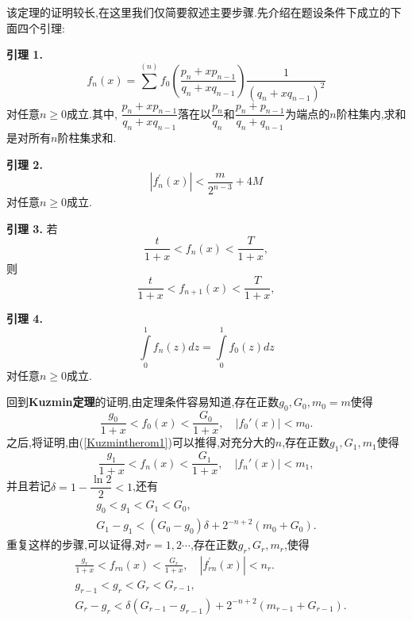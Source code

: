 该定理的证明较长,在这里我们仅简要叙述主要步骤.先介绍在题设条件下成立的下面四个引理:\par
\textbf{引理 1.  }\textsuperscript{\cite{Iosifescu}}
\begin{equation}\label{lemma1}
f_{n}\left(x\right)=\sum^{\left(n\right)}f_{0}\left(\frac{p_{n}+x p_{n-1}}{q_{n}+x q_{n-1}}\right)\frac{1}{\left(q_{n}+x q_{n-1}\right)^{2}}
\end{equation}
对任意$n\geqslant 0$成立.其中, $\dfrac{p_{n}+xp_{n-1}}{q_{n}+xq_{n-1}}$落在以$\dfrac{p_{n}}{q_{n}}$和$\dfrac{p_{n}+p_{n-1}}{q_{n}+q_{n-1}}$为端点的$n$阶柱集内,求和是对所有$n$阶柱集求和.\par
\par
\textbf{引理 2.  }\textsuperscript{\cite{Iosifescu}}
\begin{equation}\label{lemma2}
\left|f_{n}^{'}(x)\right|<\frac{m}{2^{n-3}}+4M
\end{equation}
对任意$n\geqslant0$成立.\par
\par
\textbf{引理 3.  }\textsuperscript{\cite{Iosifescu}}
若
\begin{equation}\label{lemma3eq1}
\frac{t}{1+x}<f_{n}(x)<\frac{T}{1+x},
\end{equation}
则
\begin{equation}\label{lemma3eq2}
\frac{t}{1+x}<f_{n+1}(x)<\frac{T}{1+x},
\end{equation}
\par
\textbf{引理 4.  }\textsuperscript{\cite{Iosifescu}}
\begin{equation}\label{lemma4}
\int\limits_{0}^{1}f_{n}(z)dz=\int\limits_{0}^{1}f_{0}(z)dz
\end{equation}
对任意$n\geqslant0$成立.\par
\par
回到\textbf{Kuzmin定理}的证明,由定理条件容易知道,存在正数$g_0,G_0,m_0=m$使得
\begin{equation}\label{Kuzmintherom1}
\frac{g_0}{1+x}<f_0(x)<\frac{G_0}{1+x},\quad|f_0'(x)|<m_0.
\end{equation}
之后,将证明,由(\ref{Kuzmintherom1})可以推得,对充分大的$n$,存在正数$g_1,G_1,m_1$使得
$$\frac{g_1}{1+x}<f_n(x)<\frac{G_1}{1+x},\quad|f_n'(x)|<m_1,$$
并且若记$\delta=1-\dfrac{\ln2}{2}<1$,还有
\begin{align*}
    g_0<g_1<G_1<G_0,\\
    G_1-g_1<(G_0-g_0)\delta+2^{-n+2}(m_0+G_0).
\end{align*}
重复这样的步骤,可以证得,对$r=1,2\cdots$,存在正数$g_r,G_r,m_r$,使得
\begin{equation}\label{Kuzmintherom2}\begin{aligned}
&\frac{g_r}{1+x}<f_{rn}(x)<\frac{G_r}{1+x},\quad |f_{rn}^{\prime}(x)|<n_{r}.\\
&g_{r-1}<g_{r}<G_{r}<G_{r-1},\\
&G_r-g_r<\delta(G_{r-1}-g_{r-1})+2^{-n+2}(m_{r-1}+G_{r-1}).
\end{aligned}\end{equation}
